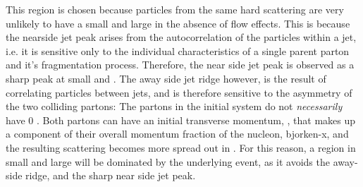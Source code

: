 This region is chosen because particles from the same hard scattering are very unlikely to have a small \deltaphi and large \deltaeta in the absence of flow effects. This is because the nearside jet peak arises from the autocorrelation of the particles within a jet, i.e. it is sensitive only to the individual characteristics of a single parent parton and it's fragmentation process. Therefore, the near side jet peak is observed as a sharp peak at small \deltaphi and \deltaeta. The away side jet ridge however, is the result of correlating particles between jets, and is therefore sensitive to the \kt asymmetry of the two colliding partons: The partons in the initial system  do not \textit{necessarily} have 0 \pt. Both partons can have an initial transverse momentum, \kt, that makes up a component of their overall momentum fraction of the nucleon, bjorken-x, and the resulting scattering becomes more spread out in \deltaeta. For this reason, a region in small \deltaphi and large \deltaeta will be dominated by the underlying event, as it avoids the away-side ridge, and the sharp near side jet peak.

